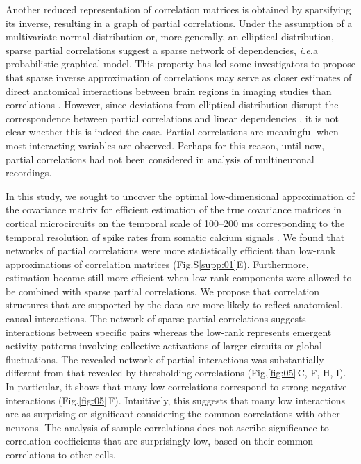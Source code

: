 \documentclass[10pt]{article}
\newcommand{\figref}[2]{Fig.\;\ref{fig:#1}\,#2}
\begin{document}
Another reduced representation of correlation matrices is obtained by sparsifying its inverse, resulting in a graph of partial correlations. Under the assumption of a multivariate normal distribution or, more generally, an elliptical distribution, sparse partial correlations suggest a sparse network of dependencies, \emph{i.e.}\;a probabilistic graphical model. This property has led some investigators to propose that sparse inverse approximation of correlations may serve as closer estimates of direct anatomical interactions between brain regions in imaging studies than correlations \cite{Varoquaux:2012,Ryali:2012}. However, since deviations from elliptical distribution disrupt the correspondence between partial correlations and linear dependencies \cite{Loh:2012}, it is not clear whether this is indeed  the case. Partial correlations are meaningful when most interacting variables are observed. Perhaps for this reason, until now, partial correlations had not been considered in analysis of multineuronal recordings.

In this study, we sought to uncover the optimal low-dimensional approximation of the covariance matrix for efficient estimation of the true covariance matrices in cortical microcircuits on the temporal scale of 100--200 ms corresponding to the temporal resolution of spike rates from somatic calcium signals \cite{Cotton:2013}.  We found that networks of partial correlations were more statistically efficient than low-rank approximations of correlation matrices (Fig.\;S\ref{supp:01}\;E). Furthermore, estimation became still more efficient when low-rank components were allowed to be combined with sparse partial correlations. We propose that correlation structures that are supported by the data  are more likely to reflect anatomical, causal interactions. The network of sparse partial correlations suggests interactions between specific pairs whereas the low-rank represents emergent activity patterns involving collective activations of larger circuits or global fluctuations. The revealed network of partial interactions was substantially different from that revealed by thresholding correlations (\figref{05}{C, F, H, I}). In particular, it shows that many low correlations correspond to strong negative interactions (\figref{05}{F}). Intuitively, this suggests that many low interactions are as surprising or significant considering the common correlations with other neurons. The analysis of sample correlations does not ascribe significance to correlation coefficients that are surprisingly low, based on their common correlations to other cells.
\end{document}
